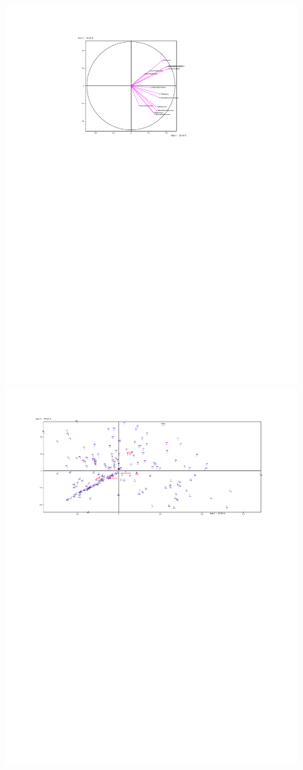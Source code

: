\documentclass[a4paper,10pt,twocolumn]{article}
\begin{document}
\begin{figure}[!ht]
\begin{center}
\includegraphics[width=16cm]{p3a.pdf}
\includegraphics[width=17cm]{p3b.pdf}

\end{center}
\end{figure}
\end{document}
